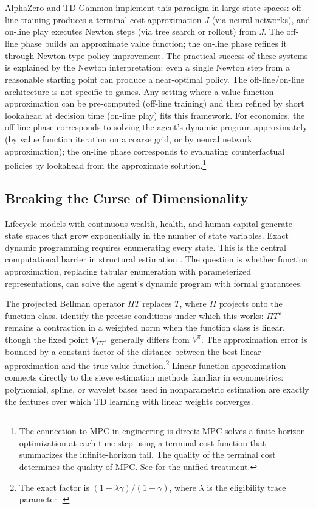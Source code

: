 AlphaZero and TD-Gammon implement this paradigm in large state spaces: off-line training produces a terminal cost approximation $\tilde{J}$ (via neural networks), and on-line play executes Newton steps (via tree search or rollout) from $\tilde{J}$. The off-line phase builds an approximate value function; the on-line phase refines it through Newton-type policy improvement. The practical success of these systems is explained by the Newton interpretation: even a single Newton step from a reasonable starting point can produce a near-optimal policy. The off-line/on-line architecture is not specific to games. Any setting where a value function approximation can be pre-computed (off-line training) and then refined by short lookahead at decision time (on-line play) fits this framework. For economics, the off-line phase corresponds to solving the agent's dynamic program approximately (by value function iteration on a coarse grid, or by neural network approximation); the on-line phase corresponds to evaluating counterfactual policies by lookahead from the approximate solution.\footnote{The connection to MPC in engineering is direct: MPC solves a finite-horizon optimization at each time step using a terminal cost function that summarizes the infinite-horizon tail. The quality of the terminal cost determines the quality of MPC. See \citet{bertsekas2024} for the unified treatment.}


\subsection{Breaking the Curse of Dimensionality}
\label{sec:curse_dimensionality}

Lifecycle models with continuous wealth, health, and human capital generate state spaces that grow exponentially in the number of state variables. Exact dynamic programming requires enumerating every state. This is the central computational barrier in structural estimation \citep{Rust1987}. The question is whether function approximation, replacing tabular enumeration with parameterized representations, can solve the agent's dynamic program with formal guarantees.

The projected Bellman operator $\Pi T$ replaces $T$, where $\Pi$ projects onto the function class. \citet{tsitsiklis1997} identify the precise conditions under which this works: $\Pi T^\pi$ remains a contraction in a weighted norm when the function class is linear, though the fixed point $V_{\Pi T^\pi}$ generally differs from $V^\pi$. The approximation error is bounded by a constant factor of the distance between the best linear approximation and the true value function.\footnote{The exact factor is $(1+\lambda\gamma)/(1-\gamma)$, where $\lambda$ is the eligibility trace parameter \citep{tsitsiklis1997}.} Linear function approximation connects directly to the sieve estimation methods familiar in econometrics: polynomial, spline, or wavelet bases used in nonparametric estimation are exactly the features over which TD learning with linear weights converges.

